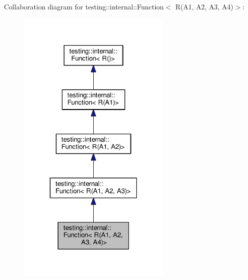 Collaboration diagram for testing\+:\+:internal\+:\+:Function$<$ R(A1, A2, A3, A4)$>$\+:
\nopagebreak
\begin{figure}[H]
\begin{center}
\leavevmode
\includegraphics[width=211pt]{structtesting_1_1internal_1_1Function_3_01R_07A1_00_01A2_00_01A3_00_01A4_08_4__coll__graph}
\end{center}
\end{figure}

